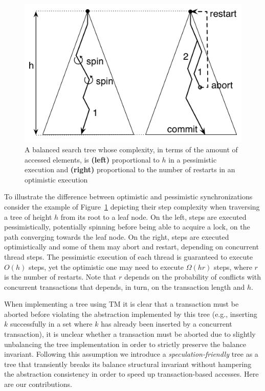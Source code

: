 \begin{figure}[t]
	\begin{center}
	\includegraphics[scale=0.4]{Tree/fig/complexity}
	\caption{A balanced search tree whose complexity, in terms of the amount of accessed elements, is {\bf (left)} proportional to $h$ 
	in a pessimistic execution and {\bf (right)} proportional to the number of restarts in an optimistic execution\label{fig:complexity}}
	\end{center}
\end{figure}

To illustrate the difference between optimistic and pessimistic 
synchronizations consider the example of 
Figure~\ref{fig:complexity} depicting their step complexity when
traversing a tree of height $h$ from its root to a leaf node. On the left, 
steps are executed pessimistically, potentially spinning before being able to acquire 
a lock, on the path converging towards the leaf node. On the right, 
steps are executed optimistically and some of them
may abort and restart, depending on concurrent thread steps. The pessimistic 
execution of each thread is guaranteed to execute $O(h)$ steps, yet the optimistic one 
may need to execute $\Omega(hr)$ steps, where $r$ is the number of restarts. 
Note that $r$ depends 
on the probability of conflicts with concurrent transactions that depends, in turn, 
on the transaction length and $h$.


When implementing a tree using TM it is clear that a transaction must be aborted before violating 
the abstraction implemented by this tree
(e.g., inserting $k$ successfully in a set where $k$ has already been inserted by a concurrent transaction),
it is unclear whether a transaction must be aborted due to
slightly unbalancing the tree implementation in order to strictly preserve the balance invariant.
Following this assumption we introduce a \emph{speculation-friendly} tree as a tree that transiently breaks its
balance structural invariant without hampering the abstraction consistency in order to speed up transaction-based accesses. 
Here are our contributions.

